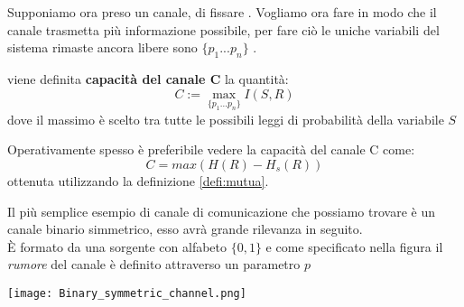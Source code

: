 Supponiamo ora preso un canale, di fissare \lepc . Vogliamo ora fare in modo che il canale trasmetta più informazione possibile, per fare ciò le uniche variabili del sistema rimaste ancora libere sono $\{p_1...p_n \}$ .
\begin{defi}
viene definita \textbf{capacità del canale C} la quantità:
\begin{equation}
C:= \max_{ \{ p_1...p_n \}} I(S,R)
\end{equation}
dove il massimo è scelto tra tutte le possibili leggi di probabilità della variabile $S$
\end{defi}
Operativamente spesso è preferibile vedere la capacità del canale C come:
\begin{equation}
C=max(H(R)-H_s(R))
\end{equation}
ottenuta utilizzando la definizione \ref{defi:mutua}.\\
\begin{oss} \label{oss:bsc}
Il più semplice esempio di canale di comunicazione che possiamo trovare è un canale binario simmetrico, esso avrà grande rilevanza in seguito.\\
È formato da una sorgente  con alfabeto $\{ 0 , 1 \}$ e come specificato nella figura il \textit{rumore} del canale è definito attraverso un parametro $p$


\texttt{[image: Binary\_symmetric\_channel.png]}

\end{oss}
